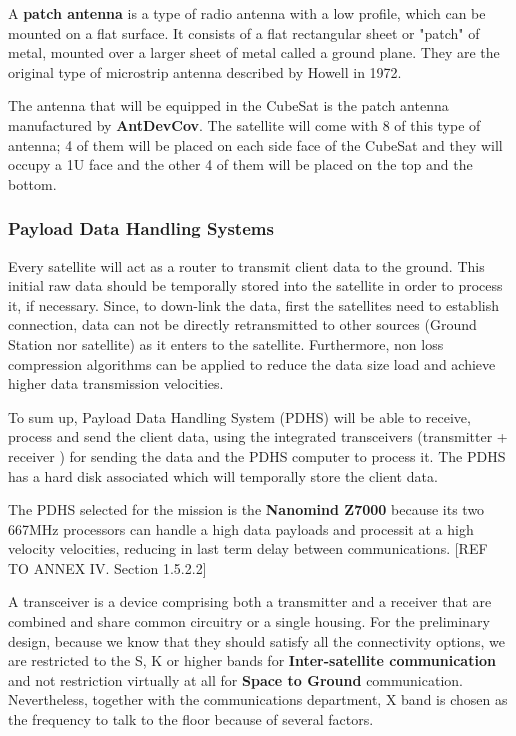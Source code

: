 A \textbf{patch antenna} is a type of radio antenna with a low profile, which can be mounted on a flat surface. It consists of a flat rectangular sheet or "patch" of metal, mounted over a larger sheet of metal called a ground plane. They are the original type of microstrip antenna described by Howell in 1972. \cite{patch}

The antenna that will be equipped in the CubeSat is the patch antenna manufactured by \textbf{AntDevCov}. The satellite will come with 8 of this type of antenna; 4 of them will be placed on each side face of the CubeSat and they will occupy a 1U face and the other 4 of them will be placed on the top and the bottom.

\subsubsection{Payload Data Handling Systems}
Every satellite will act as a router to transmit client data to the ground. This initial raw data should be temporally stored into the satellite in order to process it, if necessary. Since, to down-link the data, first the satellites need to establish connection, data can not be directly retransmitted to other sources (Ground Station nor satellite) as it enters to the satellite. Furthermore, non loss compression algorithms can be applied to reduce the data size load and achieve higher data transmission velocities.

To sum up, Payload Data Handling System (PDHS) will be able to receive, process and send the client data, using the integrated transceivers (transmitter + receiver )  for sending the data and the PDHS computer to process it. The PDHS has a hard disk associated which will temporally store the client data.

The PDHS selected for the mission is the \textbf{Nanomind Z7000} because its two 667MHz processors can handle a high data payloads and processit at a high velocity velocities, reducing in last term delay between communications.  [{REF TO ANNEX IV. Section 1.5.2.2}]

A transceiver is a device comprising both a transmitter and a receiver that are combined and share common circuitry or a single housing. For the preliminary design, because we know that they should satisfy all the connectivity options, we are restricted to the S, K or higher bands for \textbf{Inter-satellite communication} and not restriction virtually at all for \textbf{Space to Ground} communication. Nevertheless, together with the communications department, X band is chosen as the frequency to talk to the floor because of several factors.

